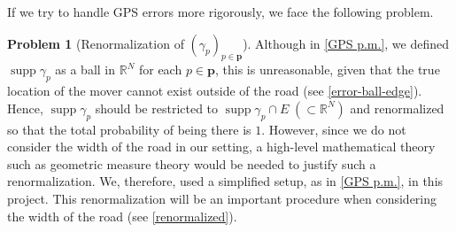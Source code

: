 \documentclass{article}
\numberwithin{equation}{section}
\theoremstyle{definition}
\newtheorem{prob}[prob]{Problem}
\newcommand{\R}{\mathbb{R}}
\DeclareMathOperator\supp{supp} %
\begin{document}
If we try to handle GPS errors more rigorously, we face the following problem.

\begin{prob}[Renormalization of $(\gamma_p)_{p\in\mathbf{p}}$]
Although in \autoref{GPS p.m.}, we defined $\supp\gamma_p$ as a ball in $\R^N$ for each $p\in\mathbf{p}$, this is unreasonable, given that the true location of the mover cannot exist outside of the road (see \autoref{error-ball-edge}).
Hence, $\supp\gamma_p$ should be restricted to $\supp\gamma_p\cap E\;(\subset\R^N)$ and renormalized so that the total probability of being there is $1$.
However, since we do not consider the width of the road in our setting, a high-level mathematical theory such as geometric measure theory would be needed to justify such a renormalization.
We, therefore, used a simplified setup, as in \autoref{GPS p.m.}, in this project.
This renormalization will be an important procedure when considering the width of the road (see \autoref{renormalized}).
\end{prob}
\end{document}
